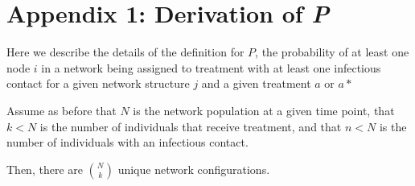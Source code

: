 \documentclass{article}
\theoremstyle{definition}
\begin{document}
\newpage



\newpage


\appendix
{}
\section{Appendix 1: Derivation of  \textit{P}}
\label{Appendix 1}
Here we describe the details of the definition for $P$, the probability of at least one node $i$ in a network being assigned to treatment with at least one infectious contact for a given network structure $j$ and a given treatment $a$ or $a*$

Assume as before that $N$ is the network population at a given time point, that $k<N$ is the number of individuals that receive treatment, and that $n<N$ is the number of individuals with an infectious contact.

 Then, there are $\binom{N}{k}$ unique network configurations.
 
\end{document}

